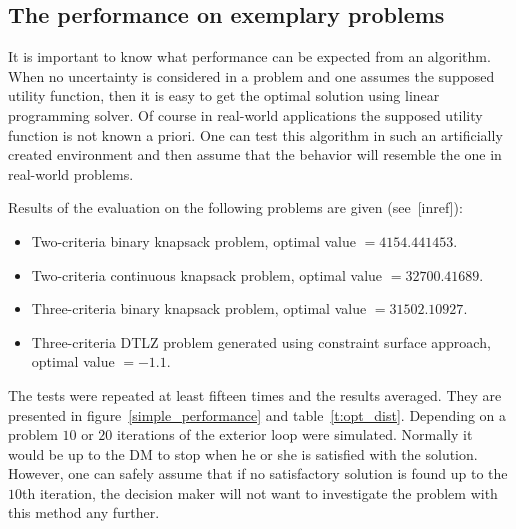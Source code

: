 \clearpage{}
\subsection{The performance on exemplary problems}
\label{nouncert-performance}
It is important to know what performance can be expected from an
algorithm. When no uncertainty is considered in a problem and one assumes the
supposed utility function, then it is easy to get the optimal solution using
linear programming solver. Of course in real-world applications the supposed
utility function is not known a priori. One can test this algorithm in such an
artificially created environment and then assume that the behavior will
resemble the one in real-world problems.

Results of the evaluation on the following problems are given (see~[inref]):
\begin{itemize}
\item Two-criteria binary knapsack problem, optimal value $= 4154.441453$.
\item Two-criteria continuous knapsack problem, optimal value $= 32700.41689$.
\item Three-criteria binary knapsack problem, optimal value $= 31502.10927$.
\item Three-criteria DTLZ problem generated using constraint surface approach, optimal value $= -1.1$.
\end{itemize}

The tests were repeated at least fifteen times and the results averaged. They
are presented in figure~\ref{simple_performance} and
table~\ref{t:opt_dist}. Depending on a problem $10$ or $20$ iterations of the
exterior loop were simulated. Normally it would be up to the DM to stop when
he or she is satisfied with the solution. However, one can safely assume that
if no satisfactory solution is found up to the $10$th iteration, the decision
maker will not want to investigate the problem with this method any further.


